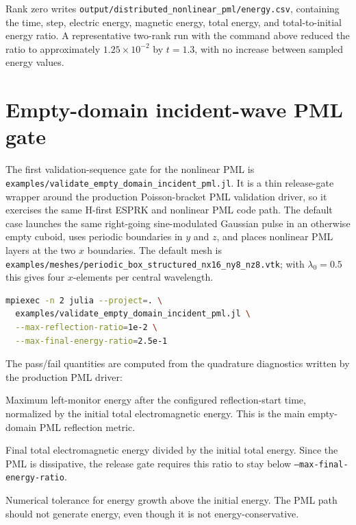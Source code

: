 \documentclass[11pt,oneside]{book}
\newcommand{\code}[1]{\texttt{#1}}
\begin{document}
Rank zero writes
\code{output/distributed\_nonlinear\_pml/energy.csv}, containing the time,
step, electric energy, magnetic energy, total energy, and total-to-initial
energy ratio. A representative two-rank run with the command above reduced
the ratio to approximately $1.25\times10^{-2}$ by $t=1.3$, with no increase
between sampled energy values.

\section{Empty-domain incident-wave PML gate}

The first validation-sequence gate for the nonlinear PML is
\code{examples/validate\_empty\_domain\_incident\_pml.jl}. It is a thin
release-gate wrapper around the production Poisson-bracket PML validation
driver, so it exercises the same H-first ESPRK and nonlinear PML code path.
The default case launches the same right-going sine-modulated Gaussian pulse
in an otherwise empty cuboid, uses periodic boundaries in $y$ and $z$, and
places nonlinear PML layers at the two $x$ boundaries. The default mesh is
\code{examples/meshes/periodic\_box\_structured\_nx16\_ny8\_nz8.vtk}; with
$\lambda_0=0.5$ this gives four $x$-elements per central wavelength.

\begin{lstlisting}[language=bash]
mpiexec -n 2 julia --project=. \
  examples/validate_empty_domain_incident_pml.jl \
  --max-reflection-ratio=1e-2 \
  --max-final-energy-ratio=2.5e-1
\end{lstlisting}

The pass/fail quantities are computed from the quadrature diagnostics written
by the production PML driver:
\begin{description}[style=nextline]
  \item[\code{reflection\_ratio}]
  Maximum left-monitor energy after the configured reflection-start time,
  normalized by the initial total electromagnetic energy. This is the main
  empty-domain PML reflection metric.

  \item[\code{final\_energy\_ratio}]
  Final total electromagnetic energy divided by the initial total energy.
  Since the PML is dissipative, the release gate requires this ratio to stay
  below \code{--max-final-energy-ratio}.

  \item[\code{max\_energy\_growth}]
  Numerical tolerance for energy growth above the initial energy. The PML
  path should not generate energy, even though it is not energy-conservative.
\end{description}
\end{document}

